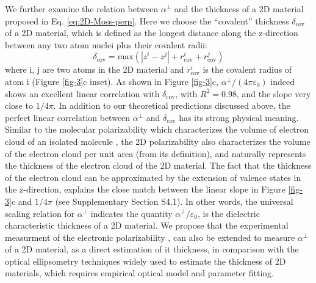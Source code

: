 \documentclass[journal=ancac3,manuscript=article,email=true,hyperref=true,keywords=false]{achemso}
\begin{document}
We further examine the relation between $\alpha^{\perp}$ and the
thickness of a 2D material proposed in
Eq. \ref{eq:2D-Moss-perp}. Here we choose the ``covalent'' thickness
$\delta_{\mathrm{cov}}$ of a 2D material, which is defined as the
longest distance along the z-direction between any two atom nuclei
plus their covalent radii:
\begin{equation}
  \label{eq:cov-thick}
  \delta_{\mathrm{cov}} = \mathrm{max}(|z^{i} - z^{j}|
  + r^{i}_{\mathrm{cov}} + r^{j}_{\mathrm{cov}})
\end{equation}
where i, j are two atoms in the 2D material and $r_{\mathrm{cov}}^{i}$
is the covalent radius of atom i (Figure \ref{fig-3}c inset). As shown
in Figure \ref{fig-3}c, $\alpha^{\perp}/(4 \pi \varepsilon_{0})$
indeed shows an excellent linear correlation with
$\delta_{\mathrm{cov}}$, with $R^{2}=0.98$, and the slope very close
to $1/4\pi$. In addition to our theoretical predictions discussed
above, the perfect linear correlation between $\alpha^{\perp}$ and
$\delta_{\mathrm{cov}}$ has its strong physical meaning. Similar to
the molecular polarizability which characterizes the volume of
electron cloud of an isolated molecule \cite{Israelachvili_2011}, the
2D polarizability also characterizes the volume of the electron cloud
per unit area (from its definition), and naturally represents the
thickness of the electron cloud of the 2D material. The fact that the
thickness of the electron cloud can be approximated by the extension
of valence states in the z-direction, explains the close match between
the linear slope in Figure \ref{fig-3}c and $1/4\pi$ (see
Supplementary Section S4.1). In other words, the universal scaling
relation for $\alpha^{\perp}$ indicates the quantity
$\alpha^{\perp}/\varepsilon_{0}$, is the dielectric characteristic
thickness of a 2D material. We propose that the experimental
measurment of the electronic polarizability
\cite{Antoine_1999,Cherniavskaya_2003,Krauss_1999_EFM}, can also be
extended to measure $\alpha^{\perp}$ of a 2D material, as a direct
estimation of it thickness, in comparison with the optical
ellipsometry techniques \cite{Weber_2010} widely used to estimate the
thickness of 2D materials, which requires empirical optical model and
parameter fitting.
\end{document}

